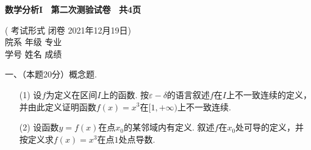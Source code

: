 \documentclass[UTF8,a4paper,10pt]{ctexart}
\begin{document}
   
   
  \vspace{-2cm}
\begin{center}
{\Large\textbf{数学分析I \  第二次测验试卷 \ 共4页}}


\vspace{0.9cm}

 ( 考试形式 \quad\quad  闭卷 \quad\quad 2021年12月19日)\\
 \bigskip
           院\quad 系\underline{\makebox[30mm][c]{    }}  年\quad 级\underline{\makebox[30mm][c]{    }}  专\quad 业\underline{\makebox[30mm][c]{}}\\
            学\quad 号\underline{\makebox[30mm][c]{    }}  姓\quad 名\underline{\makebox[30mm][c]{    }}  成\quad 绩\underline{\makebox[30mm][c]{}}\\

\end{center}



\noindent 一、（本题20分）概念题.

\begin{itemize}












\item[(1)]
设$f$为定义在区间$I$上的函数. 按$\varepsilon-\delta$的语言叙述$f$在$I$上不一致连续的定义，并由此定义证明函数$f(x)=x^3$在$[1, +\infty)$上不一致连续.











\vspace{5cm}
\item[(2)]
设函数$y=f(x)$在点$x_0$的某邻域内有定义. 叙述$f$在$x_0$处可导的定义，并按定义求$f(x)=x^3$在点$1$处点导数.










\vspace{5cm}
\end{itemize}
\end{document}
